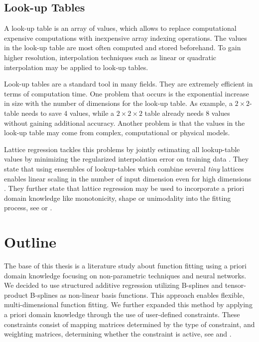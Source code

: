\subsection{Look-up Tables}

A look-up table is an array of values, which allows to replace computational expensive computations with inexpensive array indexing operations. The values in the look-up table are most often computed and stored beforehand. To gain higher resolution, interpolation techniques such as linear or quadratic interpolation may be applied to look-up tables. 

Look-up tables are a standard tool in many fields. They are extremely efficient in terms of computation time. One problem that occurs is the exponential increase in size with the number of dimensions for the look-up table. As example, a $2 \times 2$-table needs to save 4 values, while a $2 \times 2 \times 2$ table already needs 8 values without gaining additional accuracy. Another problem is that the values in the look-up table may come from complex, computational or physical models. 

Lattice regression tackles this problems by jointly estimating all lookup-table values by minimizing the regularized interpolation error on training data \cite{garcia2009lattice}. They state that using ensembles of lookup-tables which combine several \emph{tiny} lattices enables linear scaling in the number of input dimension even for high dimensions \cite{fard2016fast}. They further state that lattice regression may be used to incorporate a priori domain knowledge like monotonicity, shape or unimodality into the fitting process, see \cite{gupta2016monotonic} or \cite{you2017deep}.

\section{Outline}

The base of this thesis is a literature study about function fitting using a priori domain knowledge focusing on non-parametric techniques and neural networks. We decided to use structured additive regression \cite{fahrmeir2007regression} utilizing B-splines and tensor-product B-splines as non-linear basis functions. This approach enables flexible, multi-dimensional function fitting. We further expanded this method by applying a priori domain knowledge through the use of user-defined constraints. These constraints consist of mapping matrices determined by the type of constraint, and weighting matrices, determining whether the constraint is active, see \cite{hofner2011monotonicity} and \cite{bollaerts2006simple}.

